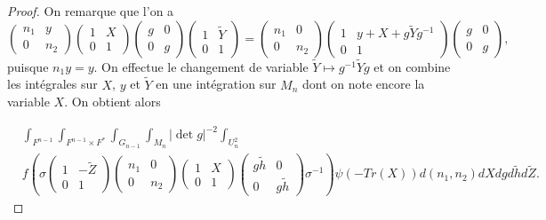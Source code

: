 \documentclass{amsart}
\begin{document}
\begin{proof}
On remarque que l'on a
\begin{equation}
\begin{pmatrix}
n_1 & y \\
0 & n_2
\end{pmatrix} \begin{pmatrix}
1 & X \\
0 & 1
\end{pmatrix} \begin{pmatrix}
g & 0 \\
0 & g
\end{pmatrix} \begin{pmatrix}
1 & \widetilde{Y} \\
0 & 1
\end{pmatrix} = \begin{pmatrix}
n_1 & 0 \\
0 & n_2
\end{pmatrix}\begin{pmatrix}
1 & y + X + g\widetilde{Y}g^{-1} \\
0 & 1
\end{pmatrix}\begin{pmatrix}
g & 0 \\
0 & g
\end{pmatrix},
\end{equation}
puisque $n_1y = y$. On effectue le changement de variable $\widetilde{Y} \mapsto g^{-1}\widetilde{Y} g$ et on combine les intégrales sur $X$, $y$ et $\widetilde{Y}$ en une intégration sur $M_n$ dont on note encore la variable $X$. On obtient alors

\begin{equation}
\label{combX}
\begin{split}
&\int_{F^{n-1}} \int_{F^{n-1} \times F^*} \int_{G_{n-1}} \int_{M_n}  |\det g|^{-2}\int_{U_n^2} \\
& f\left(\sigma \begin{pmatrix}
1 & -\widetilde{Z} \\
0 & 1
\end{pmatrix}  \begin{pmatrix}
n_1 & 0 \\
0 & n_2
\end{pmatrix} \begin{pmatrix}
1 & X \\
0 & 1
\end{pmatrix} \begin{pmatrix}
g\widetilde{h} & 0 \\
0 & g\widetilde{h}
\end{pmatrix} \sigma^{-1} \right)  \psi(-Tr(X)) d(n_1,n_2) dX dg d\widetilde{h} d\widetilde{Z}.
\end{split}
\end{equation}


\end{proof}
\end{document}
